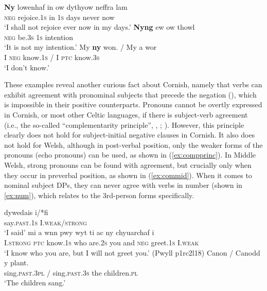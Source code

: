 \documentclass[output=paper,colorlinks,citecolor=brown]{langscibook}
\begin{document}
\ea
\ea 
\settowidth{}
\gll \textbf{Ny} lowenhaf in ow dythyow neffra lam\\
\textsc{neg} rejoice.\textsc{1s} in \textsc{1s} days never now\\\jambox{[Cornish]}
\glt `I shall not rejoice ever now in my days.'
\ex 
\gll \textbf{Nyng} ew ow thowl\\
\textsc{neg} be.\textsc{3s} \textsc{1s} intention\\
\glt `It is not my intention.'
\ex
\gll My \textbf{ny} won. / My a wor\\
I \textsc{neg} know.\textsc{1s} / I \textsc{ptc} know.\textsc{3s}\\
\glt `I don't know.'
\z
\label{ex:corneg}
\z

\noindent These examples reveal another curious fact about Cornish, namely that verbs can exhibit agreement with pronominal subjects that precede the negation (\cite[48--49(§47)]{mm:lewis1946llawlyfr}), which is impossible in their positive counterparts. Pronouns cannot be overtly expressed in Cornish, or most other Celtic languages, if there is subject-verb agreement (i.e., the so-called “complementarity principle”, \cite[292]{mm:stump_agreement_1984},  \citealt{mm:borsley_agreement_1989}; \citealt{mm:doron1988complementarity}). However, this principle clearly does not hold for subject\hyp initial negative clauses in Cornish. It also does not hold for Welsh, although in post-verbal position, only the weaker forms of the pronouns (echo pronouns) can be used, as shown in (\ref{ex:compprinc}). In Middle Welsh, strong pronouns can be found with agreement, but crucially only when they occur in preverbal position, as shown in (\ref{ex:commid}). When it comes to nominal subject DPs, they can never agree with verbs in number (shown in \ref{ex:num}), which \citet[388--389]{mm:roberts_parameter_2019}  relates to the 3rd-person forms specifically.

\ea
\ea
\settowidth{}
\gll dywedais i/*fi\\
say.\textsc{past}.\textsc{1s} I.\textsc{weak/strong}\\ 
\glt `I said'
\label{ex:compprinc}
\ex 
\gll mi a wnn pwy wyt ti ac ny chyuarchaf i\\
I.\textsc{strong} \textsc{ptc} know.\textsc{1s} who are.\textsc{2s} you and \textsc{neg} greet.\textsc{1s} I.\textsc{weak}\\ 
\glt `I know who you are, but I will not greet you.' (Pwyll p1rc2l18)
\label{ex:commid}
\ex
\gll *Canon / Canodd y plant.\\
sing.\textsc{past}.\textsc{3pl} / sing.\textsc{past}.\textsc{3s} the children.\textsc{pl}\\ 
\glt `The children sang.'
\label{ex:num}
\z
\z
\end{document}

